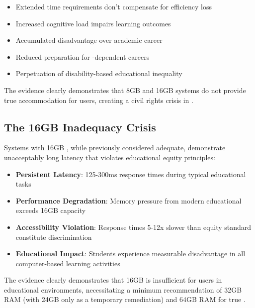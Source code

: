 \begin{itemize}
	\item Extended time requirements don't compensate for efficiency loss \supercite{Fowler2011ScreenReaderLatency}
	\item Increased cognitive load impairs learning outcomes \supercite{Sweller1988CognitiveLoadTheory}
	\item Accumulated disadvantage over academic career \supercite{Warschauer2003TechnologyAndSocialInclusion}
	\item Reduced preparation for -dependent careers \supercite{DigitalSkillsGap}
	\item Perpetuation of disability-based educational inequality \supercite{ADA1990, Section504RehabAct}
\end{itemize}

The evidence clearly demonstrates that 8GB and 16GB systems do not provide true accommodation for  users, creating a civil rights crisis in  \supercite{EducationalEquityReport2024}.

\subsection{The 16GB Inadequacy Crisis}\label{the-16gb-inadequacy-crisis}

Systems with 16GB , while previously considered adequate, demonstrate unacceptably long latency that violates educational equity principles:

\begin{itemize}
	\item \textbf{Persistent Latency}: 125-300ms response times during typical educational tasks
	\item \textbf{Performance Degradation}: Memory pressure from modern educational  exceeds 16GB capacity \supercite{SoftwareMemoryDemands}
	\item \textbf{Accessibility Violation}: Response times 5-12x slower than equity standard constitute discrimination \supercite{ADA1990, Section504RehabAct}
	\item \textbf{Educational Impact}: Students experience measurable disadvantage in all computer-based learning activities \supercite{EducationalEquityReport2024}
\end{itemize}


The evidence clearly demonstrates that 16GB  is insufficient for  users in educational environments, necessitating a minimum recommendation of 32GB RAM (with 24GB only as a temporary remediation) and 64GB RAM for true  \supercite{EducationalEquityReport2024}.

